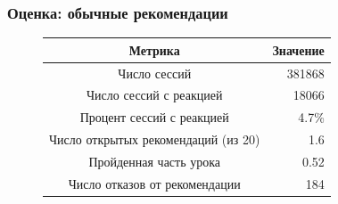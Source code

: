 \documentclass{beamer}
\begin{document}
\begin{frame}\frametitle{Оценка: обычные рекомендации}
\normalsize
    \begin{figure}
    \begin{table}[htp]
        \begin{tabular}{c | r }
          \hline
          Метрика & Значение \\
          \hline		
          \hline
          Число сессий & 381868 \\
          Число сессий с реакцией & 18066 \\
          Процент сессий с реакцией &  4.7\% \\
          Число открытых рекомендаций (из 20) & 1.6 \\
          Пройденная часть урока & 0.52 \\
          Число отказов от рекомендации & 184 \\\hline
        \end{tabular}
    \end{table}
%
      \centering
      \hfill
    \end{figure}
\end{frame}
\end{document}
